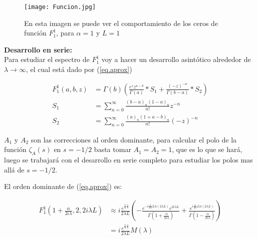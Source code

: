\begin{figure}[h!]
\centering
\texttt{[image: Funcion.jpg]}
\caption{En esta imagen se puede ver el comportamiento de los ceros de función $F _1 ^1$, para $\alpha=1$ y $L=1$}
\label{fig:funcion}
\end{figure}

\textbf{Desarrollo en serie:} \\

Para estudiar el espectro de $F _1 ^1$ voy a hacer un desarrollo asintótico alrededor de $\lambda \rightarrow \infty$, el cual está dado por (\ref{eq.aprox})


\begin{equation}
\begin{aligned}
    F _1 ^1 (a,b,z) &= \Gamma (b) 
    \left(
    \frac{e^z z ^{a-b} }{\Gamma(a)} * S_1 + \frac{(-z) ^{ -a}}{ \Gamma(b-a)} 
    * S_2
    \right) \\[5pt]
    S _1 &= \sum _{n=0} ^{\infty} \frac{(b-a) _n (1-a) _n}{n!} z ^{-n} \\[5pt]
    S _2 &= \sum _{n=0} ^{\infty} \frac{(a) _n (1+a-b) _n}{n!} (-z) ^{-n} 
\end{aligned}
\label{eq.aprox}
\end{equation}

$A_1$ y $A _2$ son las correcciones al orden dominante, para calcular el polo de la función $\zeta _A (s)$ en $s=-1/2$ basta tomar $A _1 = A _2 = 1$, que es lo que se hará, luego se trabajará con el desarrollo en serie completo para estudiar los polos mas allá de $s=-1/2$. 



El orden dominante de (\ref{eq.aprox}) es:

\begin{equation}
\begin{aligned}
    F _1 ^1 (1+  \frac{  \alpha}{2 i \lambda} ,2 ,2 i \lambda L  ) & \approx 
    i  \frac{e ^{ \frac{\pi}{4} \frac{\alpha}{\lambda} } }{2 \lambda L}
    \left( -
    \frac{e ^{- i \frac{\alpha}{2 \lambda} Ln(2 \lambda L) } e ^{2 i \lambda L} }{\Gamma(1+\frac{ \alpha}{2 i \lambda})} +
    \frac{e ^{  i \frac{\alpha}{2 \lambda} Ln(2 \lambda L) }}               {\Gamma(1-\frac{ \alpha}{2 i \lambda})}
    \right) \\[5pt]  
    &=  i  \frac{e ^{ \frac{\pi}{4} \frac{\alpha}{\lambda} } }{2 \lambda L}     M (\lambda) 
\end{aligned}
\label{eq.completa}
\end{equation}

